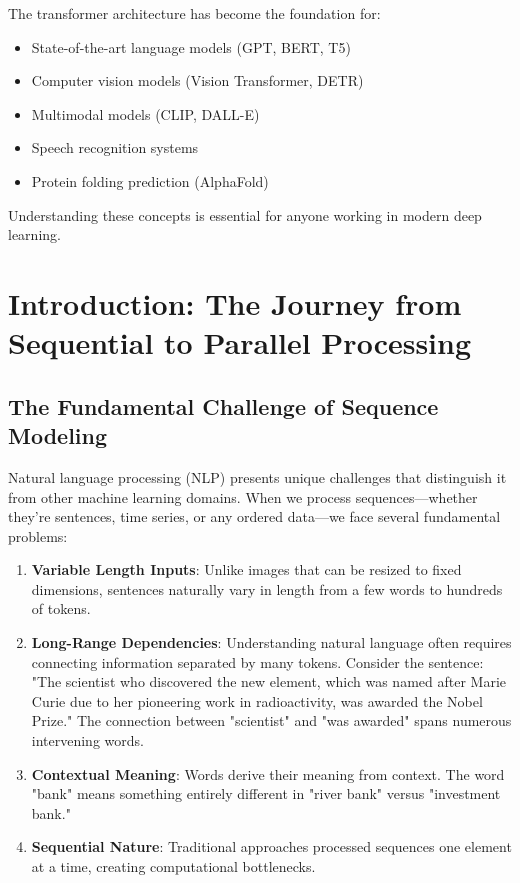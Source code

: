 \documentclass[11pt]{article}
\begin{document}
The transformer architecture has become the foundation for:
\begin{itemize}
    \item State-of-the-art language models (GPT, BERT, T5)
    \item Computer vision models (Vision Transformer, DETR)
    \item Multimodal models (CLIP, DALL-E)
    \item Speech recognition systems
    \item Protein folding prediction (AlphaFold)
\end{itemize}

Understanding these concepts is essential for anyone working in modern deep learning.

\section{Introduction: The Journey from Sequential to Parallel Processing}

\subsection{The Fundamental Challenge of Sequence Modeling}

Natural language processing (NLP) presents unique challenges that distinguish it from other machine learning domains. When we process sequences—whether they're sentences, time series, or any ordered data—we face several fundamental problems:

\begin{enumerate}
    \item \textbf{Variable Length Inputs}: Unlike images that can be resized to fixed dimensions, sentences naturally vary in length from a few words to hundreds of tokens.
    
    \item \textbf{Long-Range Dependencies}: Understanding natural language often requires connecting information separated by many tokens. Consider the sentence: "The scientist who discovered the new element, which was named after Marie Curie due to her pioneering work in radioactivity, was awarded the Nobel Prize." The connection between "scientist" and "was awarded" spans numerous intervening words.
    
    \item \textbf{Contextual Meaning}: Words derive their meaning from context. The word "bank" means something entirely different in "river bank" versus "investment bank."
    
    \item \textbf{Sequential Nature}: Traditional approaches processed sequences one element at a time, creating computational bottlenecks.
\end{enumerate}
\end{document}
